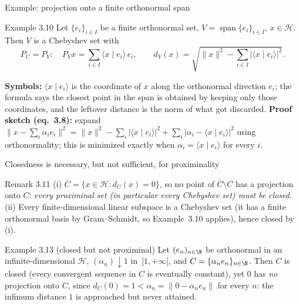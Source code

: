 \documentclass[aspectratio=169,10pt]{beamer}
\newcommand{\Hil}{\mathcal{H}}
\newcommand{\spn}{\operatorname{span}}
\newcommand{\ip}[2]{\langle #1 \mid #2 \rangle}
\newcommand{\norm}[1]{\lVert #1 \rVert}
\newcommand{\dC}{d_C}
\newcommand{\PC}{P_C}
\begin{document}
\begin{frame}{Example: projection onto a finite orthonormal span}
  \begin{block}{Example 3.10}
    Let $\{e_i\}_{i\in I}$ be a finite orthonormal set, $V=\spn\{e_i\}_{i\in
    I}$, $x\in\Hil$. Then $V$ is a Chebyshev set with
    \[
      \PC=P_V:\quad P_V x = \sum_{i\in I}\ip{x}{e_i}\,e_i, \qquad
      d_V(x) = \sqrt{\norm{x}^2 - \sum_{i\in I}\lvert\ip{x}{e_i}\rvert^2}.
    \]
  \end{block}
  \textbf{Symbols:} $\ip{x}{e_i}$ is the coordinate of $x$ along the
  orthonormal direction $e_i$; the formula says the closest point in the span
  is obtained by keeping only those coordinates, and the leftover distance is
  the norm of what got discarded. \textbf{Proof sketch (eq.\ 3.8):} expand
  $\norm{x-\sum_i \alpha_i e_i}^2 = \norm{x}^2 - \sum_i \lvert\ip{x}{e_i}
  \rvert^2 + \sum_i \lvert \alpha_i - \ip{x}{e_i}\rvert^2$ using orthonormality;
  this is minimized exactly when $\alpha_i = \ip{x}{e_i}$ for every $i$.
\end{frame}

\begin{frame}{Closedness is necessary, but not sufficient, for proximinality}
  \begin{block}{Remark 3.11}
    (i) $\overline C = \{x\in\Hil : \dC(x)=0\}$, so no point of $\overline C
    \setminus C$ has a projection onto $C$: \emph{every proximinal set (in
    particular every Chebyshev set) must be closed.}\\
    (ii) Every finite-dimensional linear subspace is a Chebyshev set (it has
    a finite orthonormal basis by Gram--Schmidt, so Example~3.10 applies),
    hence closed by (i).
  \end{block}

  \begin{block}{Example 3.13 (closed but not proximinal)}
    Let $(e_n)_{n\in\N}$ be orthonormal in an infinite-dimensional $\Hil$,
    $(\alpha_n)\downarrow 1$ in $\,]1,+\infty[$, and $C=\{\alpha_n e_n\}_{n\in
    \N}$. Then $C$ is closed (every convergent sequence in $C$ is eventually
    constant), yet $0$ has \emph{no} projection onto $C$, since
    $\dC(0)=1 < \alpha_n = \norm{0-\alpha_n e_n}$ for every $n$: the infimum
    distance $1$ is approached but never attained.
  \end{block}
\end{frame}
\end{document}
